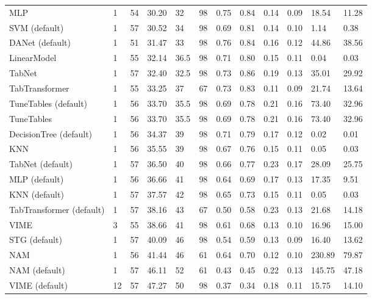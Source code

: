 \begin{tabular}{lllllrllllll}
MLP & 1 & 54 & 30.20 & 32 & 98 & 0.75 & 0.84 & 0.14 & 0.09 & 18.54 & 11.28 \\
SVM (default) & 1 & 57 & 30.52 & 34 & 98 & 0.69 & 0.81 & 0.14 & 0.10 & 1.14 & 0.38 \\
DANet (default) & 1 & 51 & 31.47 & 33 & 98 & 0.76 & 0.84 & 0.16 & 0.12 & 44.86 & 38.56 \\
LinearModel & 1 & 55 & 32.14 & 36.5 & 98 & 0.71 & 0.80 & 0.15 & 0.11 & 0.04 & 0.03 \\
TabNet & 1 & 57 & 32.40 & 32.5 & 98 & 0.73 & 0.86 & 0.19 & 0.13 & 35.01 & 29.92 \\
TabTransformer & 1 & 55 & 33.25 & 37 & 67 & 0.73 & 0.83 & 0.11 & 0.09 & 21.74 & 13.64 \\
TuneTables (default) & 1 & 56 & 33.70 & 35.5 & 98 & 0.69 & 0.78 & 0.21 & 0.16 & 73.40 & 32.96 \\
TuneTables & 1 & 56 & 33.70 & 35.5 & 98 & 0.69 & 0.78 & 0.21 & 0.16 & 73.40 & 32.96 \\
DecisionTree (default) & 1 & 56 & 34.37 & 39 & 98 & 0.71 & 0.79 & 0.17 & 0.12 & 0.02 & 0.01 \\
KNN & 1 & 56 & 35.55 & 39 & 98 & 0.67 & 0.76 & 0.15 & 0.11 & 0.05 & 0.03 \\
TabNet (default) & 1 & 57 & 36.50 & 40 & 98 & 0.66 & 0.77 & 0.23 & 0.17 & 28.09 & 25.75 \\
MLP (default) & 1 & 56 & 36.66 & 41 & 98 & 0.64 & 0.69 & 0.17 & 0.13 & 17.35 & 9.51 \\
KNN (default) & 1 & 57 & 37.57 & 42 & 98 & 0.65 & 0.73 & 0.15 & 0.11 & 0.05 & 0.03 \\
TabTransformer (default) & 1 & 57 & 38.16 & 43 & 67 & 0.50 & 0.58 & 0.23 & 0.13 & 21.68 & 14.18 \\
VIME & 3 & 55 & 38.66 & 41 & 98 & 0.61 & 0.68 & 0.13 & 0.10 & 16.96 & 15.00 \\
STG (default) & 1 & 57 & 40.09 & 46 & 98 & 0.54 & 0.59 & 0.13 & 0.09 & 16.40 & 13.62 \\
NAM & 1 & 56 & 41.44 & 46 & 61 & 0.64 & 0.70 & 0.12 & 0.10 & 230.89 & 79.87 \\
NAM (default) & 1 & 57 & 46.11 & 52 & 61 & 0.43 & 0.45 & 0.22 & 0.13 & 145.75 & 47.18 \\
VIME (default) & 12 & 57 & 47.27 & 50 & 98 & 0.37 & 0.34 & 0.18 & 0.11 & 15.75 & 14.10 \\
\bottomrule
\end{tabular}
